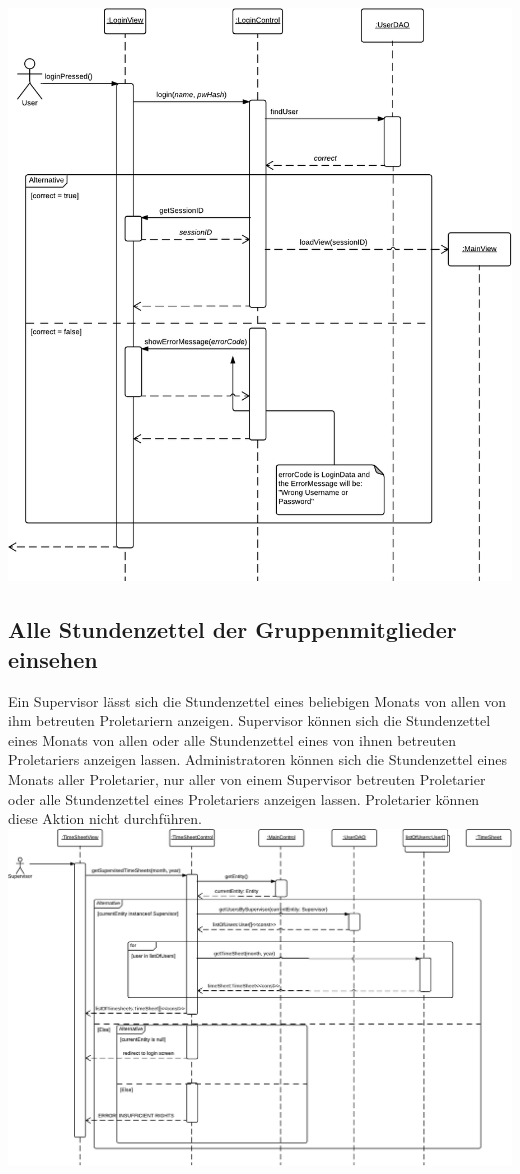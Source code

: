        \includegraphics[width=\linewidth]{Diagramms/sequenzes/login.pdf}

    \newpage
    \subsection{Alle Stundenzettel der Gruppenmitglieder einsehen}
        Ein Supervisor lässt sich die Stundenzettel eines beliebigen Monats von allen von ihm betreuten Proletariern anzeigen.
        Supervisor können sich die Stundenzettel eines Monats von allen oder alle Stundenzettel eines von ihnen betreuten Proletariers anzeigen lassen.
        Administratoren können sich die Stundenzettel eines Monats aller Proletarier, nur aller von einem Supervisor betreuten Proletarier oder alle Stundenzettel eines Proletariers anzeigen lassen.
        Proletarier können diese Aktion nicht durchführen.\\

        \includegraphics[width=\linewidth]{Diagramms/sequenzes/timesheets_of_all_supervised.pdf}

